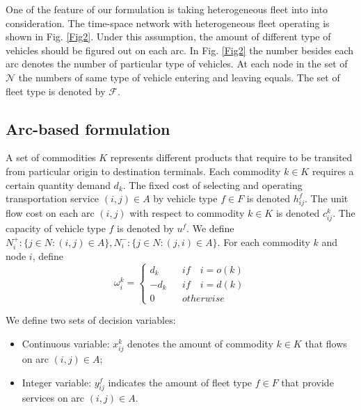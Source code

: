 \documentclass[11pt,nonblindrev,fleqn]{article}
\begin{document}
One of the feature of our formulation is taking heterogeneous fleet into into consideration. The time-space network with heterogeneous fleet operating is shown in Fig. \ref{Fig2}. Under this assumption, the amount of different type of vehicles should be figured out on each arc. In Fig. \ref{Fig2} the number besides each arc denotes the number of particular type of vehicles. At each node in the set of $\mathscr{N}$ the numbers of same type of vehicle entering and leaving equals. The set of fleet type is denoted by $\mathscr{F}$.

\subsection{Arc-based formulation}
A set of commodities $K$ represents different products that require to be transited from particular origin to destination terminals. Each commodity $k\in K$ requires a certain quantity demand $d_k$. The fixed cost of selecting and operating transportation service $(i,j)\in A$ by vehicle type $f\in F$ is denoted $h_{ij}^f$. The unit flow cost on each arc $(i,j)$ with respect to commodity $k\in K$ is denoted $c_{ij}^k$. The capacity of vehicle type $f$ is denoted by $u^f$. We define $N_i^+:\{j\in N:(i,j)\in A\},N_i^-:\{j\in N:(j,i)\in A\}$. For each commodity $k$ and node $i$, define
\begin{equation*}
\omega_i^k= \left\{
\begin{aligned}
d_k &  & if \quad i=o(k) \\
-d_k &  & if \quad i=d(k) \\
0 &  & otherwise
\end{aligned}
\right.
\end{equation*}

We define two sets of decision variables:
\begin{itemize}
  \item Continuous variable: $x_{ij}^k$ denotes the amount of commodity $k\in K$ that flows on arc $(i,j)\in A$;
  \item Integer variable: $y_{ij}^f$ indicates the amount of fleet type $f\in F$ that provide services on arc $(i,j)\in A$.
\end{itemize}
\end{document}
